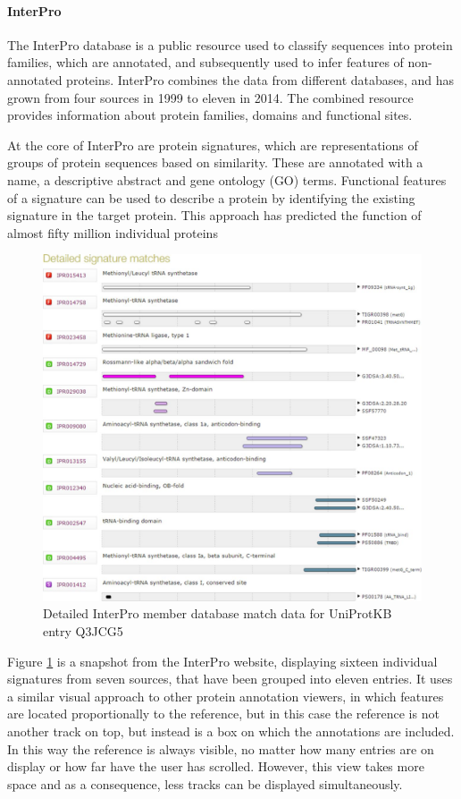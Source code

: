 \paragraph{InterPro} 
The InterPro database is a public resource used to classify sequences into protein families, which are annotated, and subsequently used to infer features of non-annotated proteins. InterPro combines the data from different databases, and has grown from four sources in 1999 to eleven in 2014. The combined resource provides information about protein families, domains and functional sites.

At the core of InterPro are protein signatures, which are representations of groups of protein sequences based on similarity. These are annotated with a name, a descriptive abstract and gene ontology (GO) terms. Functional features of a signature can be used to describe a protein by identifying the existing signature in the target protein. This approach has predicted the function of almost fifty million individual proteins \cite{MIT2014}

\begin{figure}[ht]
\centering
\includegraphics[width=6in]{figures/interpro.jpg} 
\caption[Interprot Snapshot] {Detailed InterPro member database match data for UniProtKB entry Q3JCG5} \label{fig: interior}
\end{figure}

Figure \ref{fig: interior} is a snapshot from the InterPro website, displaying sixteen individual signatures from seven sources, that have been grouped into eleven entries.
It uses a similar visual approach to other protein annotation viewers, in which features are located proportionally to the reference, but in this case the reference is not another track on top, but instead is a box on which the annotations are included. In this way the reference is always visible, no matter how many entries are on display or how far have the user has scrolled. However, this view takes more space and as a consequence, less tracks can be displayed simultaneously. 

